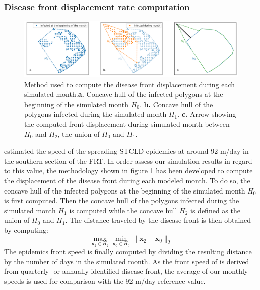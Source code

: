\documentclass[utf8]{frontiersSCNS}
\begin{document}
\subsubsection{Disease front displacement rate computation}
\begin{figure}
    \centering
    \includegraphics[width=.95\textwidth]{figures/hull_example.png}
    \caption{Method used to compute the disease front displacement during each simulated month.\textbf{a.} Concave hull of the infected polygons at the beginning of the simulated month $H_0$. \textbf{b.} Concave hull of the polygons infected during the simulated month $H_1$. \textbf{c.} Arrow showing the computed front displacement during simulated month between $H_0$ and $H_2$, the union of $H_0$ and $H_1$.}
    \label{fig:hull}
\end{figure}
\citep{muller2020spatial} estimated the speed of the spreading STCLD epidemics at around 92 m/day in the southern section of the FRT. In order assess our simulation results in regard to this value, the methodology shown in figure \ref{fig:hull} has been developed to compute the displacement of the disease front during each modeled month. To do so, the concave hull of the infected polygons at the beginning of the simulated month $H_0$ is first computed. Then the concave hull of the polygons infected during the simulated month $H_1$ is computed while the concave hull $H_2$ is defined as the union of $H_0$ and $H_1$. The distance traveled by the disease front is then obtained by computing:
\begin{equation}
    \max\limits_{\mathbf{x}_2\in H_2}\min\limits_{\mathbf{x}_0\in H_0} \|\mathbf{x}_2 - \mathbf{x}_0\|_2
\end{equation}
The epidemics front speed is finally computed by dividing the resulting distance by the number of days in the simulated month. As the front speed of \citep{muller2020spatial} is derived from quarterly- or annually-identified disease front, the average of our monthly speeds is used for comparison with the 92 m/day reference value.
\end{document}
